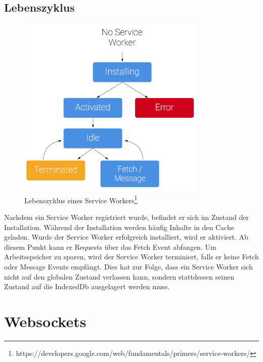 \subsection{Lebenszyklus}
\begin{figure}[!h]
	\centering
	\includegraphics[width=0.8\textwidth]{figures/sw-lifecycle}
	\caption[A Figure Short-Title]{Lebenszyklus eines Service Workers\footnote{https://developers.google.com/web/fundamentals/primers/service-workers/}}
	\label{fig:swLifecycle}
\end{figure}
Nachdem ein Service Worker registriert wurde, befindet er sich im Zustand der Installation. Während der Installation werden häufig Inhalte in den Cache geladen. Wurde der Service Worker erfolgreich installiert, wird er aktiviert. Ab diesem Punkt kann er Requests über das Fetch Event abfangen. Um Arbeitsspeicher zu sparen, wird der Service Worker terminiert, falls er keine Fetch oder Message Events empfängt. Dies hat zur Folge, dass ein Service Worker sich nicht auf den globalen Zustand verlassen kann, sondern stattdessen seinen Zustand auf die IndexedDb ausgelagert werden muss.



%


\section{Websockets}


